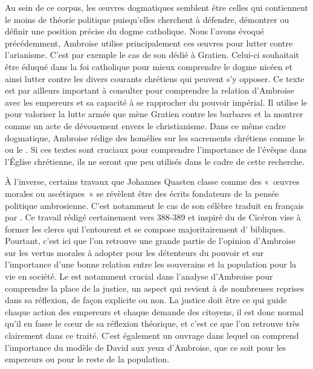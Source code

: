 \bigskip

Au sein de ce corpus, les œuvres dogmatiques semblent être celles qui contiennent le moins de théorie politique puisqu’elles cherchent à défendre, démontrer ou définir une position précise du dogme catholique. Nous l'avons évoqué précédemment, Ambroise utilise principalement ces œuvres pour lutter contre l’arianisme. C’est par exemple le cas de son  dédié à Gratien. Celui-ci souhaitait être éduqué dans la foi catholique pour mieux comprendre le dogme nicéen et ainsi lutter contre les divers courants chrétiens qui peuvent s'y opposer. Ce texte est par ailleurs important à consulter pour comprendre la relation d’Ambroise avec les empereurs et sa capacité à se rapprocher du pouvoir impérial. Il utilise le  pour valoriser la lutte armée que mène Gratien contre les barbares et la montrer comme un acte de dévouement envers le christianisme. Dans ce même cadre dogmatique, Ambroise rédige des homélies sur les sacrements chrétiens comme le  ou le . Si ces textes sont cruciaux pour comprendre l’importance de l’évêque dans l'Église chrétienne, ils ne seront que peu utilisés dans le cadre de cette recherche.

\bigskip

À l’inverse, certains travaux que Johannes Quasten classe comme des «~œuvres morales ou ascétiques~» se révèlent être des écrits fondateurs de la pensée politique ambrosienne. C’est notamment le cas de son célèbre  traduit en français par \autocite{ambroise_devoirs_1}. Ce travail rédigé certainement vers 388-389 et inspiré du  de Cicéron vise à former les clercs qui l’entourent et se compose majoritairement d’ bibliques. Pourtant, c’est ici que l’on retrouve une grande partie de l’opinion d’Ambroise sur les vertus morales à adopter pour les détenteurs du pouvoir et sur l'importance d'une bonne relation entre les souverains et la population pour la vie en société. Le  est notamment crucial dans l’analyse d’Ambroise pour comprendre la place de la justice, un aspect qui revient à de nombreuses reprises dans sa réflexion, de façon explicite ou non. La justice doit être ce qui guide chaque action des empereurs et chaque demande des citoyens, il est donc normal qu'il en fasse le cœur de sa réflexion théorique, et c'est ce que l'on retrouve très clairement dans ce traité. C'est également un ouvrage dans lequel on comprend l'importance du modèle de David aux yeux d'Ambroise, que ce soit pour les empereurs ou pour le reste de la population.

